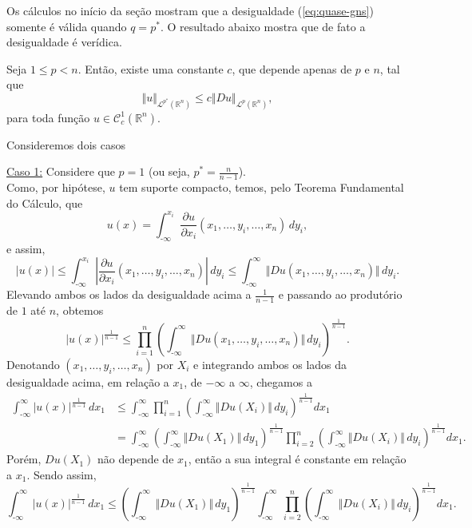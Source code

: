 \documentclass[a4paper, 11pt]{book}
\theoremstyle{definition}
\newcommand{\m}{\text{-}}
\newcommand{\bR}{\mathbb{R}}
\newcommand{\cC}{\mathcal{C}}
\newcommand{\cL}{\mathcal{L}}
\begin{document}
Os cálculos no início da seção mostram que a desigualdade (\ref{eq:quase-gns}) somente é válida quando $q = p^*$. O resultado abaixo mostra que de fato a desigualdade é verídica.

\begin{tbox} Seja $1 \leqslant p < n$. Então, existe uma constante $c$, que depende apenas de $p$ e $n$, tal que
\begin{equation} \label{eq:gns}
    \Vert u \Vert_{\cL^{p^*}(\bR^n)} \leqslant c \Vert Du \Vert_{\cL^p(\bR^n)},
\end{equation}
para toda função $u \in \cC^1_c(\bR^n)$.
\end{tbox}
\begin{prf}
    Consideremos dois casos

    \underline{Caso 1:} Considere que $p = 1$ (ou seja, $p^* = \frac{n}{n-1}$).\\
    Como, por hipótese, $u$ tem suporte compacto, temos, pelo Teorema Fundamental do Cálculo, que
    \[
        u(x) = \int_{\m\infty}^{x_i} \dfrac{\partial u}{\partial x_i}(x_1,\dots,y_i,\dots,x_n) \, dy_i,
    \]
    e assim,
    \[
        |u(x)| \leqslant \int_{\m\infty}^{x_i} \left|\dfrac{\partial u}{\partial x_i}(x_1,\dots,y_i,\dots,x_n)\right| \, dy_i  \leqslant \int_{\m\infty}^{\infty} \Vert Du(x_1,\dots,y_i,\dots,x_n) \Vert \,dy_i.
    \]
    Elevando ambos os lados da desigualdade acima a $\frac{1}{n-1}$ e passando ao produtório de $1$ até $n$, obtemos
    \[
        |u(x)|^{\frac{1}{n-1}} \leqslant \prod_{i=1}^n \left( \int_{\m\infty}^{\infty} \Vert Du(x_1,\dots,y_i,\dots,x_n) \Vert \,dy_i \right)^{\frac{1}{n-1}}.
    \]
    Denotando $(x_1,\dots,y_i,\dots,x_n)$ por $X_i$ e integrando ambos os lados da desigualdade acima, em relação a $x_1$, de $-\infty$ a $\infty$, chegamos a
    \[
        \begin{aligned}
            \int_{\m\infty}^{\infty} |u(x)|^{\frac{1}{n-1}} \,dx_1 &\leqslant \int_{\m\infty}^{\infty} \prod_{i=1}^n \left( \int_{\m\infty}^{\infty} \Vert Du(X_i) \Vert \,dy_i \right)^{\frac{1}{n-1}}  dx_1\\ 
            &= \int_{\m\infty}^{\infty} \left( \int_{\m\infty}^{\infty} \Vert Du(X_1    ) \Vert \,dy_1 \right)^{\frac{1}{n-1}}  \prod_{i=2}^n \left(\int_{\m\infty}^{\infty} \Vert Du(X_i) \Vert \, dy_i\right)^{\frac{1}{n-1}} dx_1.
        \end{aligned}
    \]
    Porém, $Du(X_1)$ não depende de $x_1$, então a sua integral é constante em relação a $x_1$. Sendo assim,
    \[
        \int_{\m\infty}^{\infty} |u(x)|^{\frac{1}{n-1}} \,dx_1 \leqslant \left( \int_{\m\infty}^{\infty} \Vert Du(X_1)\Vert \,dy_1 \right)^{\frac{1}{n-1}}\int_{\m\infty}^{\infty}   \prod_{i=2}^n \left(\int_{\m\infty}^{\infty} \Vert Du(X_i) \Vert \, dy_i\right)^{\frac{1}{n-1}} dx_1.
\]
\end{prf}
\end{document}
